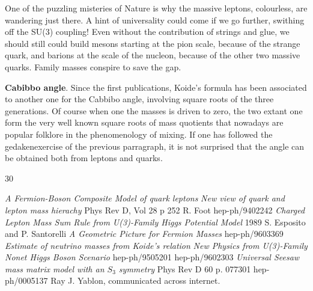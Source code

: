 \documentclass[a4paper]{article}
\begin{document}
One of the puzzling misteries of Nature is why the massive leptons,
colourless, are wandering just there. A hint of universality could
come if we go further, swithing off the SU(3) coupling! Even without
the contribution of strings and glue, we should still could build mesons 
starting at the pion scale, because of the strange quark, and barions at 
the scale of the nucleon, because of the other two massive quarks. Family
masses conspire to save the gap.


{\bf Cabibbo angle}. 
Since the first publications, Koide's formula has been associated to another
one for the Cabbibo angle, involving square roots of the three generations.
Of course when one the masses is driven to zero, the two extant one
form the very well known square roots of mass quotients that nowadays
are popular folklore in the phenomenology of mixing. If one has followed
the gedakenexercise of the previous parragraph, it is not surprised that
the angle can be obtained both from leptons and quarks. 

\begin{thebibliography}{30}


  {\it A Fermion-Boson Composite Model of quark leptons} 
  {\it New view of quark and lepton mass hierachy } Phys Rev D, Vol 28 p 252 
 R.  Foot {\it  } hep-ph/9402242 
  {\it Charged Lepton Mass Sum Rule from U(3)-Family Higgs Potential Model} 1989 
 S. Esposito and P. Santorelli {\it A Geometric Picture for Fermion Masses} hep-ph/9603369 
  {\it Estimate of neutrino masses from Koide's relation } 
  {\it  New Physics from U(3)-Family Nonet Higgs Boson Scenario} 
  {\it  } hep-ph/9505201 
  {\it  } hep-ph/9602303
  {\it Universal Seesaw mass matrix model with an $S_3$ symmetry } Phys Rev D 60 p. 077301 
  {\it  } hep-ph/0005137
  Ray J. Yablon, communicated across internet. 
\bibitem{}  {\it  } 
\bibitem{}  {\it  } 
\bibitem{}  {\it  } 
\bibitem{}  {\it  } 
\bibitem{}  {\it  } 
\bibitem{}  {\it  } 
\end{thebibliography}
\end{document}
